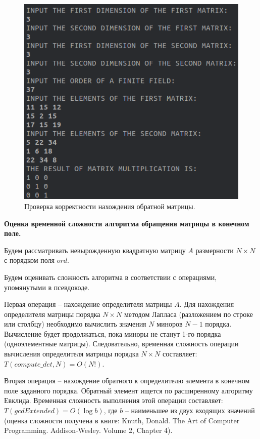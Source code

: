 \documentclass[spec, och, otchet, hidelinks]{SCWorks}
\newcommand{\tbf}[1]{\textbf{#1}}
\begin{document}
\begin{figure}[h!]
  \center\includegraphics[scale=0.5]{matrix_field_check.png}
  \caption{Проверка корректности нахождения обратной матрицы.}
\end{figure}

\par \tbf{Оценка временной сложности алгоритма обращения матрицы в конечном
  поле.}

\par Будем рассматривать невырожденную квадратную матрицу $A$ размерности $N \times
N$ с порядком поля $ord$.
\par Будем оценивать сложность алгоритма в соответствии с операциями,
упомянутыми в псевдокоде.
\par Первая операция -- нахождение определителя матрицы $A$. Для нахождения
определителя матрицы порядка $N \times N$ методом Лапласа (разложением по строке
или столбцу) необходимо вычислить значения $N$ миноров $N - 1$ порядка.
Вычисление будет продолжаться, пока миноры не станут 1-го порядка
(одноэлементные матрицы). Следовательно, временная сложность операции вычисления
определителя матрицы порядка $N \times N$ составляет: $T(compute\_det, N) =
O(N!)$.

\par Вторая операция -- нахождение обратного к определителю элемента в конечном
поле заданного порядка. Обратный элемент ищется по расширенному алгоритму
Евклида. Временная сложность выполнения этой операции составляет:
$T(gcdExtended) = O(\log b)$, где $b$ -- наименьшее из двух входящих значений
(оценка сложности получена в книге: Knuth, Donald. The Art of Computer Programming. Addison-Wesley. Volume 2,
Chapter 4).
\end{document}

